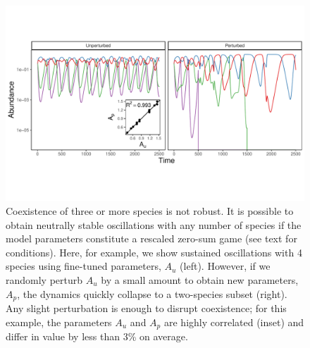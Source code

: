\documentclass[11pt]{article}
\begin{document}
\begin{figure}
	\centering
	\includegraphics[width=\textwidth]{figure_3.pdf}
	\caption[Coexistence of three or more species is not robust]{Coexistence of three or more species is not robust. It is possible to obtain neutrally stable oscillations with any number of species if the model parameters constitute a rescaled zero-sum game (see text for conditions). Here, for example, we show sustained oscillations with 4 species using fine-tuned parameters, $A_u$ (left). However, if we randomly perturb $A_u$ by a small amount to obtain new parameters, $A_p$, the dynamics quickly collapse to a two-species subset (right). Any slight perturbation is enough to disrupt coexistence; for this example, the parameters $A_u$ and $A_p$ are highly correlated (inset) and differ in value by less than 3\% on average.}
	\label{fig:fragile}
\end{figure}
\end{document}
